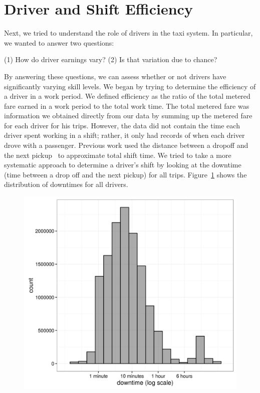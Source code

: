 \documentclass[twocolumn]{article}
\begin{document}
\section{Driver and Shift Efficiency}
Next, we tried to understand the role of drivers in the taxi system. In particular, we wanted to answer two questions:

(1) How do driver earnings vary?
(2) Is that variation due to chance?

By answering these questions, we can assess whether or not drivers have significantly varying skill levels. We began by trying to determine the efficiency of a driver in a work period. We defined efficiency as the ratio of the total metered fare earned in a work period to the total work time. The total metered fare was information we obtained directly from our data by summing up the metered fare for each driver for his trips. However, the data did not contain the time each driver spent working in a shift; rather, it only had records of when each driver drove with a passenger. Previous work used the distance between a dropoff and the next pickup~\cite{LEE:2015} to approximate total shift time. We tried to take a more systematic approach to determine a driver's shift by looking at the downtime (time between a drop off and the next pickup) for all trips. Figure~\ref{fig:downtime_distribution} shows the distribution of downtimes for all drivers. 

\begin{figure}[h]
  \centering
  \includegraphics[width=.9\linewidth]{downtime_distribution}
  \label{fig:downtime_distribution}
\end{figure}
\end{document}
